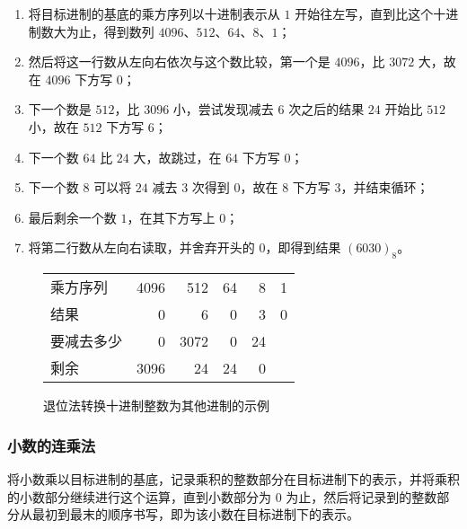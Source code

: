             \begin{enumerate}
                \item 将目标进制的基底的乘方序列以十进制表示从 $1$ 开始往左写，直到比这个十进制数大为止，得到数列 $4096$、$512$、$64$、$8$、$1$；
                \item 然后将这一行数从左向右依次与这个数比较，第一个是 $4096$，比 $3072$ 大，故在 $4096$ 下方写 $0$；
                \item 下一个数是 $512$，比 $3096$ 小，尝试发现减去 $6$ 次之后的结果 $24$ 开始比 $512$ 小，故在 $512$ 下方写 $6$；
                \item 下一个数 $64$ 比 $24$ 大，故跳过，在 $64$ 下方写 $0$；
                \item 下一个数 $8$ 可以将 $24$ 减去 $3$ 次得到 $0$，故在 $8$ 下方写 $3$，并结束循环；
                \item 最后剩余一个数 $1$，在其下方写上 $0$；
                \item 将第二行数从左向右读取，并舍弃开头的 $0$，即得到结果 $(6030)_8$。
            \end{enumerate}

            \begin{figure}
                \centering
                \begin{tabular}{lrrrrr}
                    乘方序列     & 4096 &  512 & 64 &  8 & 1 \\
                    结果         & 0    &    6 &  0 &  3 & 0 \\ \hline
                    要减去多少   & 0    & 3072 &  0 & 24 &   \\
                    剩余         & 3096 &   24 & 24 &  0 &
                \end{tabular}
                \caption{退位法转换十进制整数为其他进制的示例}
                \label{fig:NumberSystemBasics/PositionalNotationConversion/FromDecimal/IntegerDescendingSubtraction/Sample}
            \end{figure}

        \subsubsection{小数的连乘法}\label{subsubsec:NumberSystemBasics/PositionalNotationConversion/FromDecimal/FractalLongMultiplication}
            将小数乘以目标进制的基底，记录乘积的整数部分在目标进制下的表示，并将乘积的小数部分继续进行这个运算，直到小数部分为 $0$ 为止，然后将记录到的整数部分从最初到最末的顺序书写，即为该小数在目标进制下的表示。

